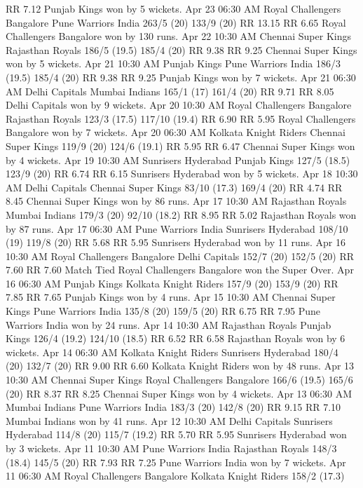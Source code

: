 RR 7.12
Punjab Kings won by 5 wickets.
Apr 23
06:30 AM
Royal Challengers Bangalore
Pune Warriors India
263/5 (20)
133/9 (20)
RR 13.15
RR 6.65
Royal Challengers Bangalore won by 130 runs.
Apr 22
10:30 AM
Chennai Super Kings
Rajasthan Royals
186/5 (19.5)
185/4 (20)
RR 9.38
RR 9.25
Chennai Super Kings won by 5 wickets.
Apr 21
10:30 AM
Punjab Kings
Pune Warriors India
186/3 (19.5)
185/4 (20)
RR 9.38
RR 9.25
Punjab Kings won by 7 wickets.
Apr 21
06:30 AM
Delhi Capitals
Mumbai Indians
165/1 (17)
161/4 (20)
RR 9.71
RR 8.05
Delhi Capitals won by 9 wickets.
Apr 20
10:30 AM
Royal Challengers Bangalore
Rajasthan Royals
123/3 (17.5)
117/10 (19.4)
RR 6.90
RR 5.95
Royal Challengers Bangalore won by 7 wickets.
Apr 20
06:30 AM
Kolkata Knight Riders
Chennai Super Kings
119/9 (20)
124/6 (19.1)
RR 5.95
RR 6.47
Chennai Super Kings won by 4 wickets.
Apr 19
10:30 AM
Sunrisers Hyderabad
Punjab Kings
127/5 (18.5)
123/9 (20)
RR 6.74
RR 6.15
Sunrisers Hyderabad won by 5 wickets.
Apr 18
10:30 AM
Delhi Capitals
Chennai Super Kings
83/10 (17.3)
169/4 (20)
RR 4.74
RR 8.45
Chennai Super Kings won by 86 runs.
Apr 17
10:30 AM
Rajasthan Royals
Mumbai Indians
179/3 (20)
92/10 (18.2)
RR 8.95
RR 5.02
Rajasthan Royals won by 87 runs.
Apr 17
06:30 AM
Pune Warriors India
Sunrisers Hyderabad
108/10 (19)
119/8 (20)
RR 5.68
RR 5.95
Sunrisers Hyderabad won by 11 runs.
Apr 16
10:30 AM
Royal Challengers Bangalore
Delhi Capitals
152/7 (20)
152/5 (20)
RR 7.60
RR 7.60
Match Tied Royal Challengers Bangalore won the Super Over.
Apr 16
06:30 AM
Punjab Kings
Kolkata Knight Riders
157/9 (20)
153/9 (20)
RR 7.85
RR 7.65
Punjab Kings won by 4 runs.
Apr 15
10:30 AM
Chennai Super Kings
Pune Warriors India
135/8 (20)
159/5 (20)
RR 6.75
RR 7.95
Pune Warriors India won by 24 runs.
Apr 14
10:30 AM
Rajasthan Royals
Punjab Kings
126/4 (19.2)
124/10 (18.5)
RR 6.52
RR 6.58
Rajasthan Royals won by 6 wickets.
Apr 14
06:30 AM
Kolkata Knight Riders
Sunrisers Hyderabad
180/4 (20)
132/7 (20)
RR 9.00
RR 6.60
Kolkata Knight Riders won by 48 runs.
Apr 13
10:30 AM
Chennai Super Kings
Royal Challengers Bangalore
166/6 (19.5)
165/6 (20)
RR 8.37
RR 8.25
Chennai Super Kings won by 4 wickets.
Apr 13
06:30 AM
Mumbai Indians
Pune Warriors India
183/3 (20)
142/8 (20)
RR 9.15
RR 7.10
Mumbai Indians won by 41 runs.
Apr 12
10:30 AM
Delhi Capitals
Sunrisers Hyderabad
114/8 (20)
115/7 (19.2)
RR 5.70
RR 5.95
Sunrisers Hyderabad won by 3 wickets.
Apr 11
10:30 AM
Pune Warriors India
Rajasthan Royals
148/3 (18.4)
145/5 (20)
RR 7.93
RR 7.25
Pune Warriors India won by 7 wickets.
Apr 11
06:30 AM
Royal Challengers Bangalore
Kolkata Knight Riders
158/2 (17.3)

